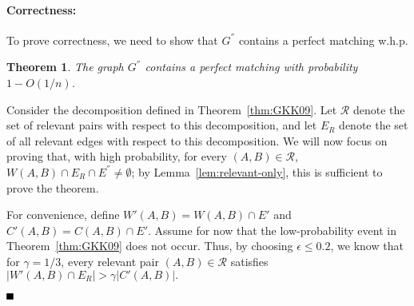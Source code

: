 \documentclass[11pt]{article}
\newcommand{\qed}{\mbox{}\hspace*{\fill}\nolinebreak\mbox{$\rule{0.6em}{0.6em}$}
}
\newtheorem{theorem}{Theorem}[section]
\newenvironment{proof}{{\bf Proof:}}{$\qed$\par}
\newcommand{\coll}{{\mathcal R}}
\begin{document}
\paragraph{Correctness:} To prove correctness, we need to show that $G^{''}$
contains a perfect matching w.h.p.
\begin{theorem}\label{thm:correctness}
  The graph $G^{''}$ contains a perfect matching with probability $1 -
  O(1/n)$.
\end{theorem}
\begin{proof}
  Consider the decomposition defined in Theorem~\ref{thm:GKK09}.  Let $\coll$
  denote the set of relevant pairs with respect to this decomposition, and let
  $E_R$ denote the set of all relevant edges with respect to this
  decomposition.  We will now focus on proving that, with high probability,
  for every $(A,B) \in \coll$, $W(A,B) \cap E_R \cap E^{''}\neq \emptyset$; by
  Lemma~\ref{lem:relevant-only}, this is sufficient to prove the theorem.

  For convenience, define $W'(A,B) = W(A,B)\cap E'$ and $C'(A,B) = C(A,B) \cap
  E'$. Assume for now that the low-probability event in
  Theorem~\ref{thm:GKK09} does not occur. Thus, by choosing $\epsilon \le
  0.2$, we know that for $\gamma = 1/3$, every relevant pair $(A,B) \in \coll$
  satisfies
  $ |W'(A,B) \cap E_R| > \gamma |C'(A,B)|.$
  

\end{proof}
\end{document}
